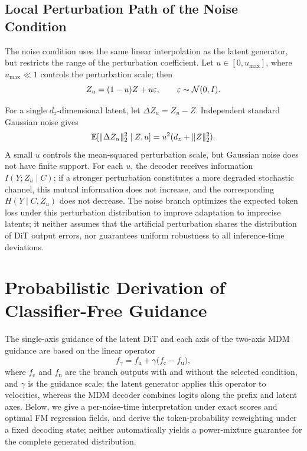 \subsection{Local Perturbation Path of the Noise Condition}

The \textsf{noise} condition uses the same linear interpolation as the latent generator, but restricts the range of the perturbation coefficient. Let $u\in[0,u_{\max}]$, where $u_{\max}\ll1$ controls the perturbation scale; then
\begin{equation}
    Z_u=(1-u)Z+u\varepsilon,
    \qquad
    \varepsilon\sim\mathcal{N}(0,I).
    \label{eq:app-shared-path}
\end{equation}

For a single $d_z$-dimensional latent, let $\Delta Z_u=Z_u-Z$. Independent standard Gaussian noise gives
\begin{equation}
    \mathbb{E}[\|\Delta Z_u\|_2^2\mid Z,u]
    =u^2(d_z+\|Z\|_2^2).
    \label{eq:app-noise-perturbation-scale}
\end{equation}
A small $u$ controls the mean-squared perturbation scale, but Gaussian noise does not have finite support. For each $u$, the decoder receives information $I(Y;Z_u\mid C)$; if a stronger perturbation constitutes a more degraded stochastic channel, this mutual information does not increase, and the corresponding $H(Y\mid C,Z_u)$ does not decrease. The \textsf{noise} branch optimizes the expected token loss under this perturbation distribution to improve adaptation to imprecise latents; it neither assumes that the artificial perturbation shares the distribution of DiT output errors, nor guarantees uniform robustness to all inference-time deviations.

\section{Probabilistic Derivation of Classifier-Free Guidance}
\label{app:cfg}

The single-axis guidance of the latent DiT and each axis of the two-axis MDM guidance are based on the linear operator
\begin{equation}
    f_\gamma
    =f_{\mathrm u}+\gamma\big(f_{\mathrm c}-f_{\mathrm u}\big),
    \label{eq:app-cfg-general}
\end{equation}
where $f_{\mathrm c}$ and $f_{\mathrm u}$ are the branch outputs with and without the selected condition, and $\gamma$ is the guidance scale; the latent generator applies this operator to velocities, whereas the MDM decoder combines logits along the prefix and latent axes. Below, we give a per-noise-time interpretation under exact scores and optimal FM regression fields, and derive the token-probability reweighting under a fixed decoding state; neither automatically yields a power-mixture guarantee for the complete generated distribution.

